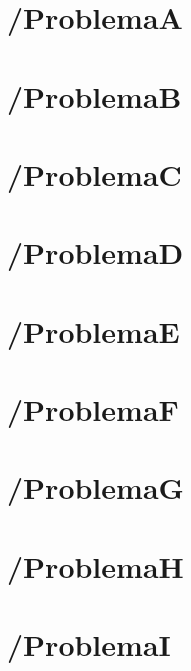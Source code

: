 \newcommand{\tituloProblema}[2]{\textbf{\\#1. #2\\}}
\acresetall
\label{cap-problemas-textos}
\section{/ProblemaA}

\newpage
\section{/ProblemaB}

\newpage
\section{/ProblemaC}

\newpage
\section{/ProblemaD}

\newpage
\section{/ProblemaE}

\newpage
\section{/ProblemaF}

\newpage
\section{/ProblemaG}

\newpage
\section{/ProblemaH}

\newpage
\section{/ProblemaI}

